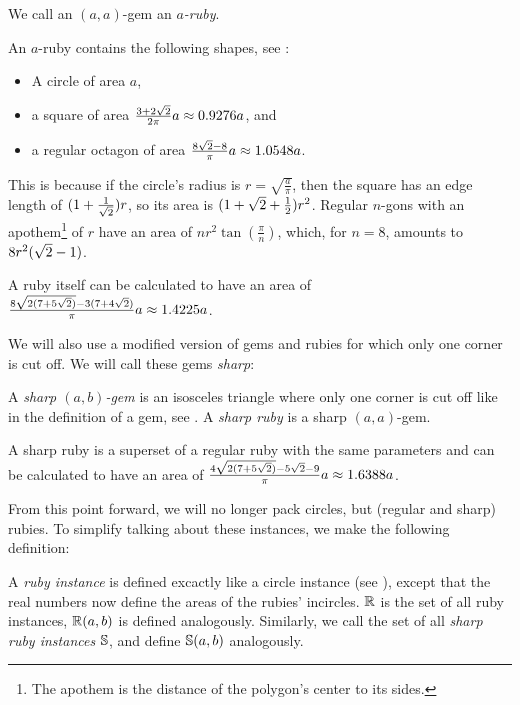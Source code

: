 \documentclass[a4paper,style=print,bibliography=totoc,nexus,lnum,extramargin]{tubsbook}
\begin{document}
\begin{definition}
    We call an $(a,a)$-gem an \emph{$a$-ruby}.
\end{definition}

An $a$-ruby contains the following shapes, see :

\begin{itemize}
    \item A circle of area $a$,
    \item a square of area $\frac{3+2\sqrt{2}}{2\pi}a \approx 0.9276a$, and
    \item a regular octagon of area $\frac{8\sqrt{2}-8}{\pi}a \approx 1.0548a$.
\end{itemize}

This is because if the circle's radius is $r = \sqrt{\frac{a}{\pi}}$, then the square has an edge length of $(1+\frac{1}{\sqrt{2}})r$, so its area is $(1+\sqrt{2}+\frac{1}{2})r^2$. Regular $n$-gons with an apothem\footnote{The apothem is the distance of the polygon's center to its sides.} of $r$ have an area of $nr^2\tan(\frac{\pi}{n})$, which, for $n=8$, amounts to $8r^2(\sqrt{2}-1)$.


A ruby itself can be calculated to have an area of $\frac{8\sqrt{2(7+5\sqrt{2})}-3(7+4\sqrt{2})}{\pi}a \approx 1.4225a$.

We will also use a modified version of gems and rubies for which only one corner is cut off. We will call these gems \emph{sharp}:

\begin{definition}
    A \emph{sharp $(a,b)$-gem} is an isosceles triangle where only one corner is cut off like in the definition of a gem, see . A \emph{sharp ruby} is a sharp $(a,a)$-gem.
\end{definition}


A sharp ruby is a superset of a regular ruby with the same parameters and can be calculated to have an area of $\frac{4\sqrt{2(7+5\sqrt{2})}-5\sqrt{2}-9}{\pi}a \approx 1.6388a$.

From this point forward, we will no longer pack circles, but (regular and sharp) rubies. To simplify talking about these instances, we make the following definition:

\begin{definition}
    A \emph{ruby instance} is defined excactly like a circle instance (see ), except that the real numbers now define the areas of the rubies' incircles. $\mathbb{R}$ is the set of all ruby instances, $\mathbb{R}(a,b)$ is defined analogously.
    Similarly, we call the set of all \emph{sharp ruby instances} $\mathbb{S}$, and define $\mathbb{S}(a,b)$ analogously.
\end{definition}
\end{document}
